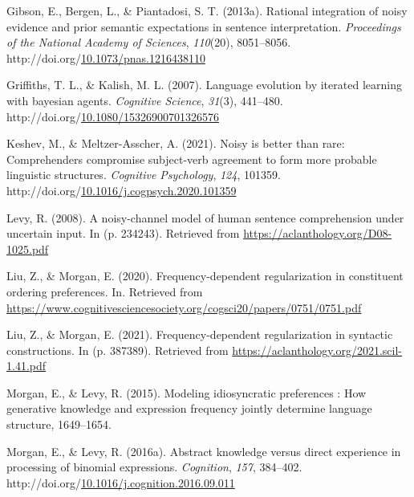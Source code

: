 \documentclass[10pt, letterpaper]{article}
\newenvironment{CSLReferences}%
  {}%
  {\par}
\begin{document}
\begin{CSLReferences}{1}{0}
\leavevmode{}%
Gibson, E., Bergen, L., \& Piantadosi, S. T. (2013a). Rational
integration of noisy evidence and prior semantic expectations in
sentence interpretation. \emph{Proceedings of the National Academy of
Sciences}, \emph{110}(20), 8051--8056.
http://doi.org/\href{https://doi.org/10.1073/pnas.1216438110}{10.1073/pnas.1216438110}

\leavevmode{}%
Griffiths, T. L., \& Kalish, M. L. (2007). Language evolution by
iterated learning with bayesian agents. \emph{Cognitive Science},
\emph{31}(3), 441--480.
http://doi.org/\href{https://doi.org/10.1080/15326900701326576}{10.1080/15326900701326576}

\leavevmode{}%
Keshev, M., \& Meltzer-Asscher, A. (2021). Noisy is better than rare:
Comprehenders compromise subject-verb agreement to form more probable
linguistic structures. \emph{Cognitive Psychology}, \emph{124}, 101359.
http://doi.org/\href{https://doi.org/10.1016/j.cogpsych.2020.101359}{10.1016/j.cogpsych.2020.101359}

\leavevmode{}%
Levy, R. (2008). A noisy-channel model of human sentence comprehension
under uncertain input. In (p. 234243). Retrieved from
\url{https://aclanthology.org/D08-1025.pdf}

\leavevmode{}%
Liu, Z., \& Morgan, E. (2020). Frequency-dependent regularization in
constituent ordering preferences. In. Retrieved from
\url{https://www.cognitivesciencesociety.org/cogsci20/papers/0751/0751.pdf}

\leavevmode{}%
Liu, Z., \& Morgan, E. (2021). Frequency-dependent regularization in
syntactic constructions. In (p. 387389). Retrieved from
\url{https://aclanthology.org/2021.scil-1.41.pdf}

\leavevmode{}%
Morgan, E., \& Levy, R. (2015). Modeling idiosyncratic preferences : How
generative knowledge and expression frequency jointly determine language
structure, 1649--1654.

\leavevmode{}%
Morgan, E., \& Levy, R. (2016a). Abstract knowledge versus direct
experience in processing of binomial expressions. \emph{Cognition},
\emph{157}, 384--402.
http://doi.org/\href{https://doi.org/10.1016/j.cognition.2016.09.011}{10.1016/j.cognition.2016.09.011}


\end{CSLReferences}
\end{document}
